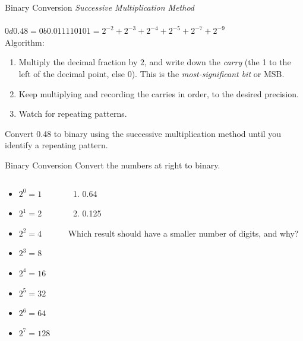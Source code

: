 \documentclass{beamer}
\begin{document}
\begin{frame}{Binary Conversion}
\textit{Successive Multiplication Method} \\ \vspace{0.5cm} \hrulefill \\
$0d0.48 = 0b0.011110101 = 2^{-2}+2^{-3}+2^{-4}+2^{-5}+2^{-7}+2^{-9}$ \\
Algorithm:
\begin{enumerate}
\item Multiply the decimal fraction by 2, and write down the \textit{carry} (the 1 to the left of the decimal point, else 0).  This is the \textit{most-significant bit} or MSB.
\item Keep multiplying and recording the carries in order, to the desired precision.
\item Watch for repeating patterns.
\end{enumerate}
Convert 0.48 to binary using the successive multiplication method until you identify a repeating pattern.
\end{frame}

\begin{frame}{Binary Conversion}
Convert the numbers at right to binary. \\ \vspace{1cm}
\begin{columns}[T]
\begin{column}{0.5\textwidth}
\begin{itemize}
\item $2^0 = 1$
\item $2^1 = 2$
\item $2^2 = 4$
\item $2^3 = 8$
\item $2^4 = 16$
\item $2^5 = 32$
\item $2^6 = 64$
\item $2^7 = 128$
\end{itemize}
\end{column}
\begin{column}{0.5\textwidth}
\small
\begin{enumerate}
\item 0.64
\item 0.125
\end{enumerate}
Which result should have a smaller number of digits, and why?
\end{column}
\end{columns}
\end{frame}
\end{document}
